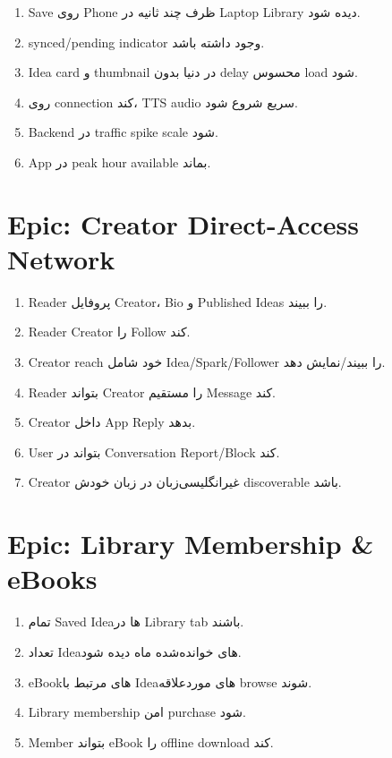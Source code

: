 \begin{enumerate}
  \item Save روی Phone ظرف چند ثانیه در Laptop Library دیده شود. \eng{[NFR-05]}
  \item synced/pending indicator وجود داشته باشد. \eng{[NFR-05]}
  \item Idea card و thumbnail در دنیا بدون delay محسوس load شود. \eng{[NFR-08]}
  \item روی connection کند، TTS audio سریع شروع شود. \eng{[NFR-08]}
  \item Backend در traffic spike scale شود. \eng{[NFR-04]}
  \item App در peak hour available بماند. \eng{[NFR-06]}
\end{enumerate}

\section{Epic: Creator Direct-Access Network}

\begin{enumerate}
  \item Reader پروفایل Creator، Bio و Published Ideas را ببیند. \eng{[NFR-01]}
  \item Reader Creator را Follow کند. \eng{[NFR-01]}
  \item Creator reach خود شامل Idea/Spark/Follower را ببیند/نمایش دهد. \eng{[NFR-01]}
  \item Reader بتواند Creator را مستقیم Message کند. \eng{[NFR-13]}
  \item Creator داخل App Reply بدهد. \eng{[NFR-13]}
  \item User بتواند در Conversation Report/Block کند. \eng{[NFR-15]}
  \item Creator غیرانگلیسی‌زبان در زبان خودش discoverable باشد. \eng{[NFR-18]}
\end{enumerate}

\section{Epic: Library Membership \& eBooks}

\begin{enumerate}
  \item تمام Saved Ideaها در Library tab باشند. \eng{[NFR-05]}
  \item تعداد Ideaهای خوانده‌شده ماه دیده شود. \eng{[NFR-11]}
  \item eBookهای مرتبط با Ideaهای موردعلاقه browse شوند. \eng{[NFR-11]}
  \item Library membership امن purchase شود. \eng{[NFR-14]}
  \item Member بتواند eBook را offline download کند. \eng{[NFR-11]}
\end{enumerate}

